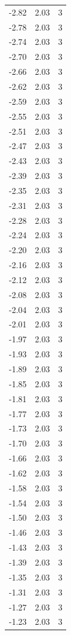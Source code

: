 \begin{longtable}{lrr}
  -2.82 & 2.03 & 3 \\
  -2.78 & 2.03 & 3 \\
  -2.74 & 2.03 & 3 \\
  -2.70 & 2.03 & 3 \\
  -2.66 & 2.03 & 3 \\
  -2.62 & 2.03 & 3 \\
  -2.59 & 2.03 & 3 \\
  -2.55 & 2.03 & 3 \\
  -2.51 & 2.03 & 3 \\
  -2.47 & 2.03 & 3 \\
  -2.43 & 2.03 & 3 \\
  -2.39 & 2.03 & 3 \\
  -2.35 & 2.03 & 3 \\
  -2.31 & 2.03 & 3 \\
  -2.28 & 2.03 & 3 \\
  -2.24 & 2.03 & 3 \\
  -2.20 & 2.03 & 3 \\
  -2.16 & 2.03 & 3 \\
  -2.12 & 2.03 & 3 \\
  -2.08 & 2.03 & 3 \\
  -2.04 & 2.03 & 3 \\
  -2.01 & 2.03 & 3 \\
  -1.97 & 2.03 & 3 \\
  -1.93 & 2.03 & 3 \\
  -1.89 & 2.03 & 3 \\
  -1.85 & 2.03 & 3 \\
  -1.81 & 2.03 & 3 \\
  -1.77 & 2.03 & 3 \\
  -1.73 & 2.03 & 3 \\
  -1.70 & 2.03 & 3 \\
  -1.66 & 2.03 & 3 \\
  -1.62 & 2.03 & 3 \\
  -1.58 & 2.03 & 3 \\
  -1.54 & 2.03 & 3 \\
  -1.50 & 2.03 & 3 \\
  -1.46 & 2.03 & 3 \\
  -1.43 & 2.03 & 3 \\
  -1.39 & 2.03 & 3 \\
  -1.35 & 2.03 & 3 \\
  -1.31 & 2.03 & 3 \\
  -1.27 & 2.03 & 3 \\
  -1.23 & 2.03 & 3 \\

\end{longtable}
